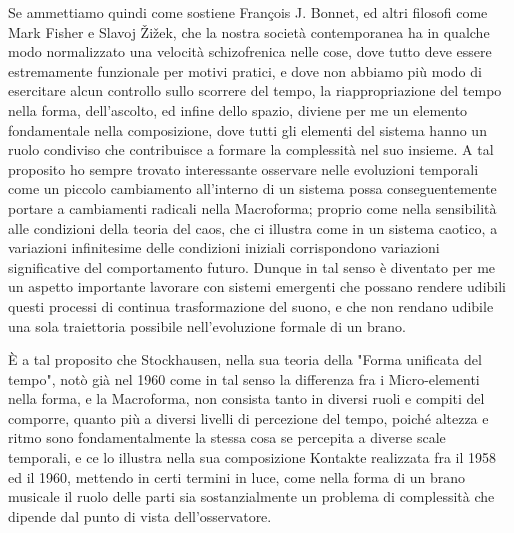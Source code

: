Se ammettiamo quindi come sostiene François J. Bonnet, ed altri filosofi come Mark Fisher e Slavoj Žižek,
che la nostra società contemporanea ha in qualche modo normalizzato
una velocità schizofrenica nelle cose, dove tutto deve essere estremamente funzionale per motivi pratici,
e dove non abbiamo più modo di esercitare alcun controllo sullo scorrere del tempo,
la riappropriazione del tempo nella forma, dell'ascolto, ed infine dello spazio, diviene per me un elemento fondamentale
nella composizione,
dove tutti gli elementi del sistema hanno un ruolo condiviso che contribuisce 
a formare la complessità nel suo insieme.
A tal proposito ho sempre trovato interessante osservare nelle evoluzioni temporali 
come un piccolo cambiamento all'interno di un sistema possa conseguentemente portare 
a cambiamenti radicali
nella Macroforma; proprio come nella sensibilità alle condizioni della teoria del caos, 
che ci illustra come in un sistema caotico, a variazioni infinitesime delle condizioni iniziali 
corrispondono variazioni significative del comportamento futuro. 
Dunque in tal senso è diventato per me un aspetto importante lavorare con
sistemi emergenti che possano rendere udibili questi processi di continua trasformazione
del suono, e che non rendano udibile una sola traiettoria possibile nell'evoluzione formale
di un brano.

È a tal proposito che Stockhausen, nella sua teoria della "Forma unificata del tempo", 
notò già nel 1960 come in tal senso la differenza fra i Micro-elementi nella forma, 
e la Macroforma, non consista tanto in diversi ruoli e compiti del comporre,
quanto più a diversi livelli di percezione del tempo, 
poiché altezza e ritmo sono fondamentalmente la stessa cosa se percepita a diverse scale temporali,
e ce lo illustra nella sua composizione Kontakte realizzata fra il 1958 ed il 1960, 
mettendo in certi termini in luce,
come nella forma di un brano musicale il ruolo delle parti sia sostanzialmente un problema 
di complessità
che dipende dal punto di vista dell'osservatore.

%
